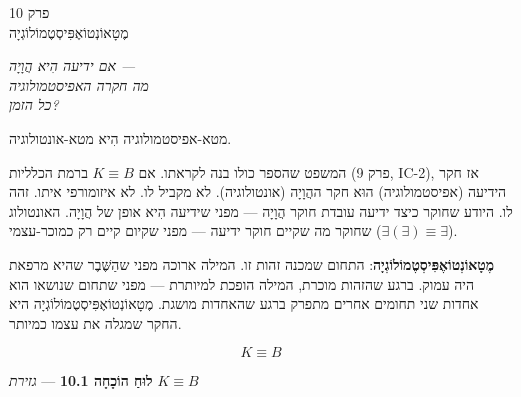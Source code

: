 \documentclass[10pt, openany, oneside]{book}
\renewcommand{\large}{\fontsize{11.5}{14}\selectfont}
\renewcommand{\huge}{\fontsize{17}{21}\selectfont}
\begin{document}
\newpage

\begin{center}
    {\huge\textsc{פרק 10}}\\[0.3em]
    {\large\textsc{מֶטָאוֹנְטוֹאֶפִּיסְטֶמוֹלוֹגְיָה}}
\end{center}

\vspace{1.5em}

\begin{center}
    \textit{%
    אם ידיעה הִיא הֲוָיָה —\\
    מה חקרה האפיסטמולוגיה\\
    כל הזמן?}
\end{center}

\vspace{2em}


\noindent מטא-אפיסטמולוגיה הִיא מטא-אונטולוגיה.

המשפט שהספר כולו בנה לקראתו. אם $K \equiv B$ ברמת הכלליות (פרק 9, IC-2), אז חקר הידיעה (אפיסטמולוגיה) הוּא חקר ההֲוָיָה (אונטולוגיה). לא מקביל לו. לא איזומורפי איתו. זהה לו. היודע שחוקר כיצד ידיעה עובדת חוקר הֲוָיָה — מפני שידיעה הִיא אופן של הֲוָיָה. האונטולוג שחוקר מה שקיים חוקר ידיעה — מפני שקיום קיים רק כמוכר-עצמי ($\exists(\exists) \equiv \exists$).

\textbf{מֶטָאוֹנְטוֹאֶפִּיסְטֶמוֹלוֹגְיָה}: התחום שמכנה זהות זו. המילה ארוכה מפני שהַשֶּׁבֶר שהיא מרפאת היה עמוק. ברגע שהזהות מוכרת, המילה הופכת למיותרת — מפני שתחום שנושאו הוא אחדות שני תחומים אחרים מתפרק ברגע שהאחדות מושגת. מֶטָאוֹנְטוֹאֶפִּיסְטֶמוֹלוֹגְיָה היא החקר שמגלה את עצמו כמיותר.

$$\boxed{K \equiv B}$$

\vspace{0.5em}

\textbf{לוּחַ הוֹכָחָה 10.1} --- \textit{גזירת $K \equiv B$}

\vspace{0.5em}
\end{document}
